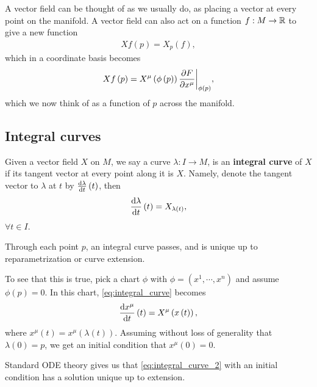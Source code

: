 
A vector field can be thought of as we usually do, as placing a vector at every point on the manifold. A vector field can also act on a function $f : M \to \mathbb{R}$ to give a new function
\begin{align}
    X f\left( p \right) = X_{p} \left( f \right) 
,\end{align}
which in a coordinate basis becomes
\begin{align}
    X f \left( p \right) = X^{\mu} \left( \phi \left( p \right)  \right) \pdv{F}{x^{\mu}} \bigg|_{\phi \left( p \right) }
,\end{align}
which we now think of as a function of $p$ across the manifold.

\subsection{Integral curves}

\begin{definition}
    Given a vector field $X$ on $M$, we say a curve $\lambda : I \to M$, is an \textbf{integral curve} of $X$ if its tangent vector at every point along it is $X$. Namely, denote the tangent vector to $\lambda$ at $t$ by $\dv{\lambda}{t}\left( t \right) $, then
    \begin{align}\label{eq:integral_curve}
        \dv{\lambda}{t}\left( t \right) = X_{\lambda \left( t \right) }
    ,\end{align}
    $\forall t \in I$.
\end{definition}

Through each point $p$, an integral curve passes, and is unique up to reparametrization or curve extension.

To see that this is true, pick a chart $\phi$ with $\phi = \left( x^{1}, \cdots, x^{n} \right) $ and assume $\phi \left( p \right) = 0$. In this chart, \cref{eq:integral_curve} becomes
\begin{align} \label{eq:integral_curve_2}
    \dv{x^{\mu}}{t}\left( t \right) = X^{\mu} \left( x\left( t \right)  \right) 
,\end{align}
where $x^{\mu} \left( t \right) = x^{\mu}\left( \lambda \left( t \right)  \right) $. Assuming without loss of generality that $\lambda \left( 0 \right) = p$, we get an initial condition that $x^{\mu} \left( 0 \right) = 0$.

Standard ODE theory gives us that \cref{eq:integral_curve_2} with an initial condition has a solution unique up to extension.

